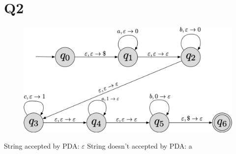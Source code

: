 \documentclass{article}
\begin{document}
\section{Q2}
\begin{figure}[h]
	 \centering
	\includegraphics[scale=0.5]{Q2}
\end{figure}
\noindent
\hspace{1.7cm} String accepted by PDA: $\varepsilon$ 	\hspace{2cm}  \qquad
String doesn't accepted by PDA: a
\end{document}

